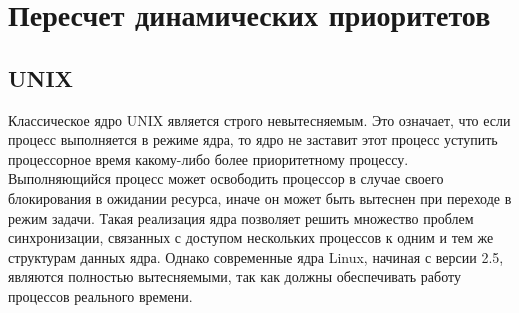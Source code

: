 \documentclass[a4paper,oneside,14pt]{extreport}
\begin{document}
	\chapter{Пересчет динамических приоритетов}
	\section{UNIX}
	Классическое ядро UNIX является строго невытесняемым. Это означает, что если процесс выполняется в режиме ядра, то ядро не заставит этот процесс уступить процессорное время какому-либо более приоритетному процессу. Выполняющийся процесс может освободить процессор в случае своего блокирования в ожидании ресурса, иначе он может быть вытеснен при переходе в режим задачи. Такая реализация ядра позволяет решить множество проблем синхронизации, связанных с доступом нескольких процессов к одним и тем же структурам данных ядра.
	Однако современные ядра Linux, начиная с версии 2.5, являются полностью вытесняемыми, так как должны обеспечивать работу процессов реального времени.
\end{document}
